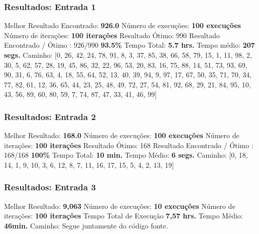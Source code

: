 \documentclass{article}
\begin{document}
\subsubsection{Resultados: Entrada 1} 
 Melhor Resultado Encontrado: \textbf{926.0}
  \newline
 Número de execuções: \textbf{100 execuções}
 \newline
 Número de iterações: \textbf{100 iterações}
 \newline
 \newline
 Resultado Ótimo: 990
 \newline
 Resultado Encontrado / Ótimo :  926/990 \textbf{93.5\%} 
 \newline
 \newline
 Tempo Total: \textbf{5.7 hrs.}
 Tempo médio: \textbf{207 segs.} 
 \newline
 \newline
 Caminho: [0, 26, 42, 24, 78, 91, 8, 3, 37, 85, 38, 66, 58, 79, 15, 1, 11, 98, 2, 30, 5, 62, 57, 28, 19, 45, 86, 32, 22, 96, 53, 20, 83, 16, 75, 88, 14, 51, 73, 93, 69, 90, 31, 6, 76, 63, 4, 18, 55, 64, 52, 13, 40, 39, 94, 9, 97, 17, 67, 50, 35, 71, 70, 34, 77, 82, 61, 12, 36, 65, 44, 23, 25, 48, 49, 72, 27, 54, 81, 92, 68, 29, 21, 84, 95, 10, 43, 56, 89, 60, 80, 59, 7, 74, 87, 47, 33, 41, 46, 99]


\subsubsection{Resultados: Entrada 2}
 Melhor Resultado: \textbf{168.0}  
 \newline
 Número de execuções: \textbf{100 execuções}
 \newline
 Número de iterações: \textbf{100 iterações}
 \newline
 \newline
 Resultado Ótimo: 168
 \newline
 Resultado Encontrado / Ótimo :  168/168 \textbf{100\%} 
 \newline
 \newline
 Tempo Total: \textbf{10 min.}
 Tempo Médio: \textbf{6 segs.}
 \newline
 \newline
 Caminho: [0, 18, 14, 1, 9, 10, 3, 6, 12, 8, 7, 11, 16, 17, 15, 5, 4, 2, 13, 19]

\newpage

\subsubsection{Resultados: Entrada 3}
 Melhor Resultado: \textbf{9,063}
 \newline
 Número de execuções: \textbf{10 execuções}
 \newline
 Número de iterações: \textbf{100 iterações}
 \newline
 \newline
 Tempo Total de Execução \textbf{7,57 hrs.}
 Tempo Médio: \textbf{46min.}
 \newline
 \newline
 Caminho: Segue juntamente do código fonte.
 
\end{document}
